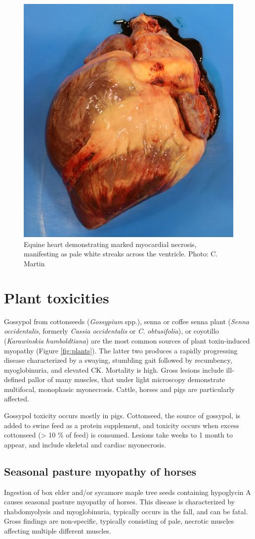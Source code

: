\documentclass[openany]{book}
\begin{document}
\begin{figure}

{\centering \includegraphics[width=0.3\linewidth]{images/heart-necrosis-2} 

}

\caption{Equine heart demonstrating marked myocardial necrosis, manifesting as pale white streaks across the ventricle. Photo: C. Martin}\label{fig:heart-necrosis2}
\end{figure}

\section{Plant toxicities}\label{plant-toxicities}

Gossypol from cottonseeds (\emph{Gossypium} spp.), senna or coffee senna
plant (\emph{Senna occidentalis}, formerly \emph{Cassia occidentalis} or
\emph{C. obtusifolia}), or coyotillo (\emph{Karawinskia humboldtiana})
are the most common sources of plant toxin-induced myopathy (Figure
\ref{fig:plants}). The latter two produces a rapidly progressing disease
characterized by a swaying, stumbling gait followed by recumbency,
myoglobinuria, and elevated CK. Mortality is high. Gross lesions include
ill-defined pallor of many muscles, that under light microscopy
demonstrate multifocal, monophasic myonecrosis. Cattle, horses and pigs
are particularly affected.

Gossypol toxicity occurs mostly in pigs. Cottonseed, the source of
gossypol, is added to swine feed as a protein supplement, and toxicity
occurs when excess cottonseed (\textgreater{} 10 \% of feed) is
consumed. Lesions take weeks to 1 month to appear, and include skeletal
and cardiac myonecrosis.

\subsection{Seasonal pasture myopathy of
horses}\label{seasonal-pasture-myopathy-of-horses}

Ingestion of box elder and/or sycamore maple tree seeds containing
hypoglycin A causes seasonal pasture myopathy of horses. This disease is
characterized by rhabdomyolysis and myoglobinuria, typically occurs in
the fall, and can be fatal. Gross findings are non-specific, typically
consisting of pale, necrotic muscles affecting multiple different
muscles.
\end{document}
